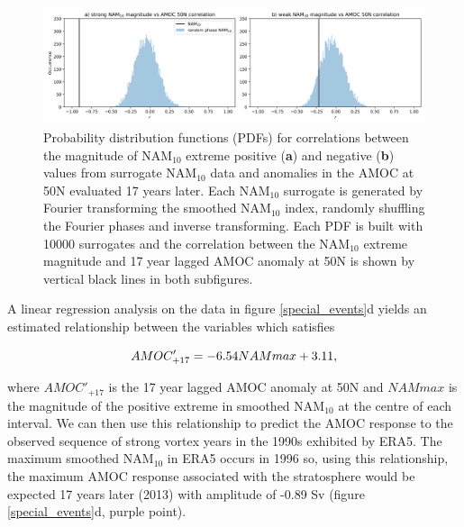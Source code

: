 \begin{center}
\begin{figure}[h!]
\noindent\includegraphics[width = \linewidth]{Figures/Figures-surface/correlation_stat_sigs.png}
\caption{Probability distribution functions (PDFs) for correlations between the magnitude of NAM$_{10}$ extreme positive (\textbf{a}) and negative (\textbf{b}) values from surrogate NAM$_{10}$ data and anomalies in the AMOC at 50N evaluated 17 years later. Each NAM$_{10}$ surrogate is generated by Fourier transforming the smoothed NAM$_{10}$ index, randomly shuffling the Fourier phases and inverse transforming. Each PDF is built with 10000 surrogates and the correlation between the NAM$_{10}$ extreme magnitude and 17 year lagged AMOC anomaly at 50N is shown by vertical black lines in both subfigures.}
\label{cors_stat_sigs}
\end{figure}
\end{center}

A linear regression analysis on the data in figure \ref{special_events}d yields an estimated relationship between the variables which satisfies

\begin{equation}
AMOC'_{+17} = -6.54\space NAM max + 3.11,
\end{equation}

where $AMOC'_{+17}$ is the 17 year lagged AMOC anomaly at 50N and $NAM max$ is the magnitude of the positive extreme in smoothed NAM$_{10}$ at the centre of each interval. We can then use this relationship to predict the AMOC response to the observed sequence of strong vortex years in the 1990s exhibited by ERA5. The maximum smoothed NAM$_{10}$ in ERA5 occurs in 1996 so, using this relationship, the maximum AMOC response associated with the stratosphere would be expected 17 years later (2013) with amplitude of -0.89 Sv (figure \ref{special_events}d, purple point).

